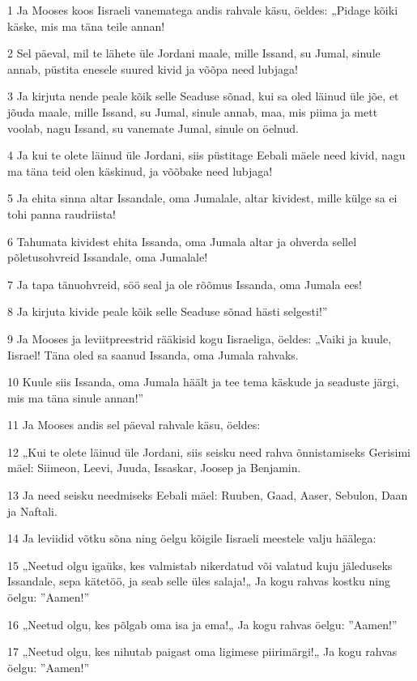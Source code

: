 \par 1 Ja Mooses koos Iisraeli vanematega andis rahvale käsu, öeldes: „Pidage kõiki käske, mis ma täna teile annan!
\par 2 Sel päeval, mil te lähete üle Jordani maale, mille Issand, su Jumal, sinule annab, püstita enesele suured kivid ja võõpa need lubjaga!
\par 3 Ja kirjuta nende peale kõik selle Seaduse sõnad, kui sa oled läinud üle jõe, et jõuda maale, mille Issand, su Jumal, sinule annab, maa, mis piima ja mett voolab, nagu Issand, su vanemate Jumal, sinule on öelnud.
\par 4 Ja kui te olete läinud üle Jordani, siis püstitage Eebali mäele need kivid, nagu ma täna teid olen käskinud, ja võõbake need lubjaga!
\par 5 Ja ehita sinna altar Issandale, oma Jumalale, altar kividest, mille külge sa ei tohi panna raudriista!
\par 6 Tahumata kividest ehita Issanda, oma Jumala altar ja ohverda sellel põletusohvreid Issandale, oma Jumalale!
\par 7 Ja tapa tänuohvreid, söö seal ja ole rõõmus Issanda, oma Jumala ees!
\par 8 Ja kirjuta kivide peale kõik selle Seaduse sõnad hästi selgesti!”
\par 9 Ja Mooses ja leviitpreestrid rääkisid kogu Iisraeliga, öeldes: „Vaiki ja kuule, Iisrael! Täna oled sa saanud Issanda, oma Jumala rahvaks.
\par 10 Kuule siis Issanda, oma Jumala häält ja tee tema käskude ja seaduste järgi, mis ma täna sinule annan!”
\par 11 Ja Mooses andis sel päeval rahvale käsu, öeldes:
\par 12 „Kui te olete läinud üle Jordani, siis seisku need rahva õnnistamiseks Gerisimi mäel: Siimeon, Leevi, Juuda, Issaskar, Joosep ja Benjamin.
\par 13 Ja need seisku needmiseks Eebali mäel: Ruuben, Gaad, Aaser, Sebulon, Daan ja Naftali.
\par 14 Ja leviidid võtku sõna ning öelgu kõigile Iisraeli meestele valju häälega:
\par 15 „Neetud olgu igaüks, kes valmistab nikerdatud või valatud kuju jäleduseks Issandale, sepa kätetöö, ja seab selle üles salaja!„ Ja kogu rahvas kostku ning öelgu: ”Aamen!”
\par 16 „Neetud olgu, kes põlgab oma isa ja ema!„ Ja kogu rahvas öelgu: ”Aamen!”
\par 17 „Neetud olgu, kes nihutab paigast oma ligimese piirimärgi!„ Ja kogu rahvas öelgu: ”Aamen!”
